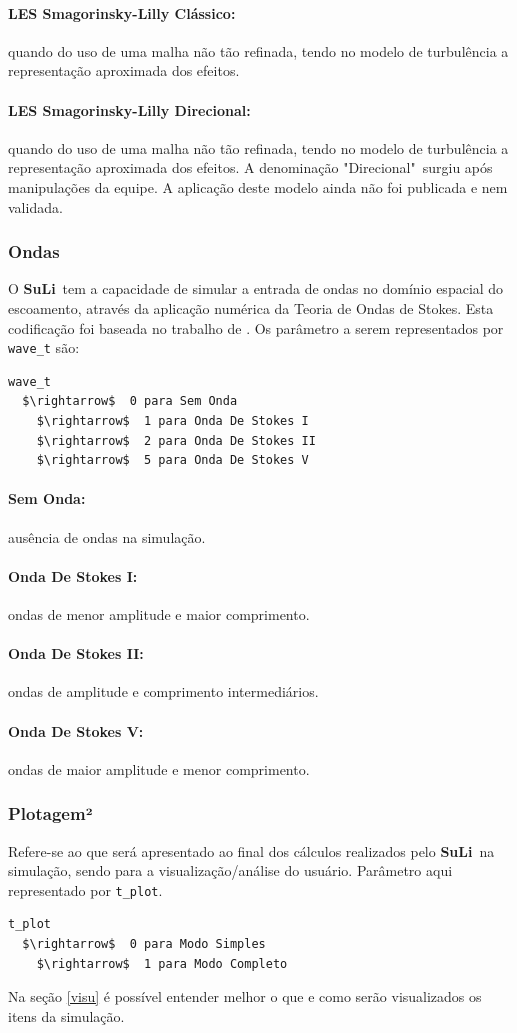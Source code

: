 \documentclass[12pt, a4paper]{article}
\newcommand{\SL}{{\bf SuLi}}
\begin{document}
\paragraph{LES Smagorinsky-Lilly Clássico:} quando do uso de uma malha não tão refinada, tendo no modelo de turbulência a representação aproximada dos efeitos.
\paragraph{LES Smagorinsky-Lilly Direcional:} quando do uso de uma malha não tão refinada, tendo no modelo de turbulência a representação aproximada dos efeitos. A denominação "Direcional"\ surgiu após manipulações da equipe. A aplicação deste modelo ainda não foi publicada e nem validada.

\subsubsection{Ondas}
O \SL\ tem a capacidade de simular a entrada de ondas no domínio espacial do escoamento, através da aplicação numérica da Teoria de Ondas de Stokes. Esta codificação foi baseada no trabalho de \cite{higuera2013}. Os parâmetro a serem representados por \verb|wave_t| são:
\begin{lstlisting}[escapeinside='']
wave_t	
  $\rightarrow$  0 para Sem Onda
	$\rightarrow$  1 para Onda De Stokes I
	$\rightarrow$  2 para Onda De Stokes II
	$\rightarrow$  5 para Onda De Stokes V
\end{lstlisting}

\paragraph{Sem Onda:} ausência de ondas na simulação.
\paragraph{Onda De Stokes I:} ondas de menor amplitude e maior comprimento.
\paragraph{Onda De Stokes II:} ondas de amplitude e comprimento intermediários.
\paragraph{Onda De Stokes V:} ondas de maior amplitude e menor comprimento.


\subsubsection{Plotagem²}
Refere-se ao que será apresentado ao final dos cálculos realizados pelo \SL\ na simulação, sendo para a visualização/análise do usuário. Parâmetro aqui representado por \verb|t_plot|.
\begin{lstlisting}
t_plot	
  $\rightarrow$  0 para Modo Simples
	$\rightarrow$  1 para Modo Completo
\end{lstlisting}
Na seção \ref{visu} é possível entender melhor o que e como serão visualizados os itens da simulação.
\end{document}
